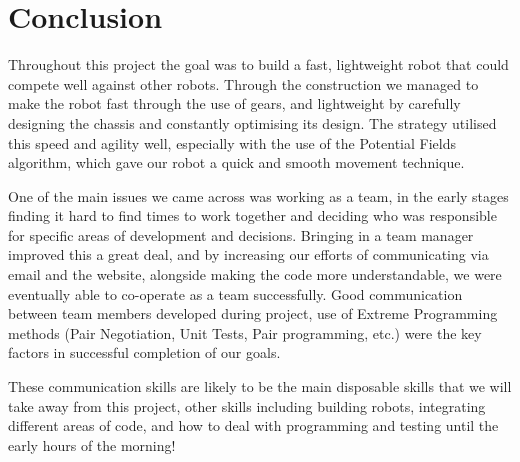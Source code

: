 \section{Conclusion}

Throughout this project the goal was to build a fast, lightweight robot that could compete well against other robots. Through the construction we managed to make the robot fast through the use of gears, and lightweight by carefully designing the chassis and constantly optimising its design. The strategy utilised this speed and agility well, especially with the use of the Potential Fields algorithm, which gave our robot a quick and smooth movement technique. \linebreak

One of the main issues we came across was working as a team, in the early stages finding it hard to find times to work together and deciding who was responsible for specific areas of development and decisions. Bringing in a team manager improved this a great deal, and by increasing our efforts of communicating via email and the website, alongside making the code more understandable, we were eventually able to co-operate as a team successfully. Good communication between team members developed during project, use of Extreme Programming methods (Pair Negotiation, Unit Tests, Pair programming, etc.) were the key factors in successful completion of our goals.\linebreak

 These communication skills are likely to be the main disposable skills that we will take away from this project, other skills including building robots, integrating different areas of code, and how to deal with programming and testing until the early hours of the morning!